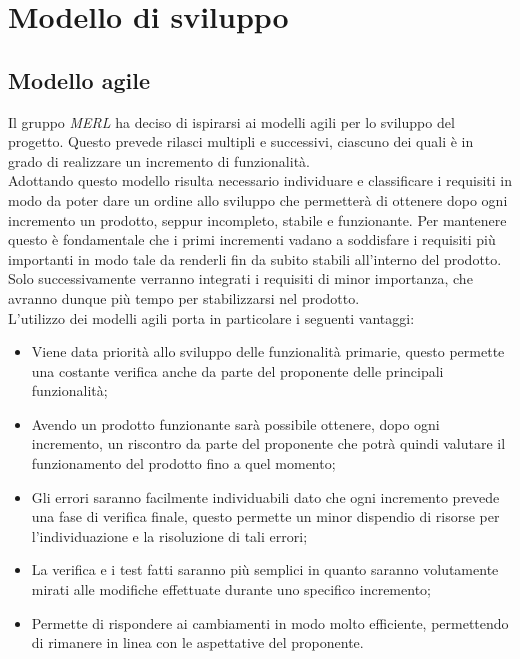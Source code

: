 \chapter{Modello di sviluppo}

\section{Modello agile}
Il gruppo \textit{MERL} ha deciso di ispirarsi ai modelli agili per lo sviluppo del progetto. Questo prevede rilasci multipli e successivi, ciascuno dei quali è in grado di realizzare un incremento di funzionalità.
\\Adottando questo modello risulta necessario individuare e classificare i requisiti in modo da poter dare un ordine allo sviluppo che permetterà di ottenere dopo ogni incremento un prodotto, seppur incompleto, stabile e funzionante. Per mantenere questo è fondamentale che i primi incrementi vadano a soddisfare i requisiti più importanti in modo tale da renderli fin da subito stabili all'interno del prodotto. Solo successivamente verranno integrati i requisiti di minor importanza, che avranno dunque più tempo per stabilizzarsi nel prodotto.
\\L'utilizzo dei modelli agili porta in particolare i seguenti vantaggi:
\begin{itemize}
  \item Viene data priorità allo sviluppo delle funzionalità primarie, questo permette una costante verifica anche da parte del proponente delle principali funzionalità;
  \item Avendo un prodotto funzionante sarà possibile ottenere, dopo ogni incremento, un riscontro da parte del proponente che potrà quindi valutare il funzionamento del prodotto fino a quel momento;
  \item Gli errori saranno facilmente individuabili dato che ogni incremento prevede una fase di verifica finale, questo permette un minor dispendio di risorse per l'individuazione e la risoluzione di tali errori;
  \item La verifica e i test fatti saranno più semplici in quanto saranno volutamente mirati alle modifiche effettuate durante uno specifico incremento;
  \item Permette di rispondere ai cambiamenti in modo molto efficiente, permettendo di rimanere in linea con le aspettative del proponente.
\end{itemize}

